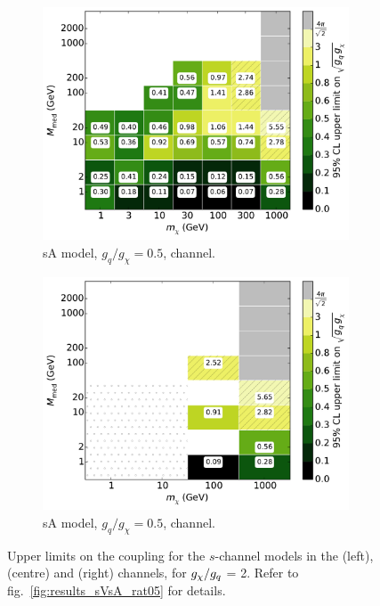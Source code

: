 \begin{figure}
\begin{subfigure}[t]{0.32\textwidth}
    \includegraphics[width=1.\textwidth]{figures/grid_allpoints_SAD_rat2.pdf}
    \caption{sA model, $g_q/g_{\chi} = 0.5$, \monoZ channel.}
  \end{subfigure}
  \begin{subfigure}[t]{0.32\textwidth}
    \centering
    \includegraphics[width=1.\textwidth]{figures/grid_basepoints_SAD_rat2_monoWZ.pdf}
    \caption{sA model, $g_q/g_{\chi} = 0.5$, \monoWZ channel.}
  \end{subfigure}
  \caption{Upper limits on the coupling for the $s$-channel models in the \monojet (left), \monoZ (centre) and \monoWZ (right) channels, for $g_{\chi} / g_q$ = 2. Refer to fig.~\ref{fig:results_sVsA_rat05} for details.}
  \label{fig:results_sVsA_rat2}
\end{figure}


